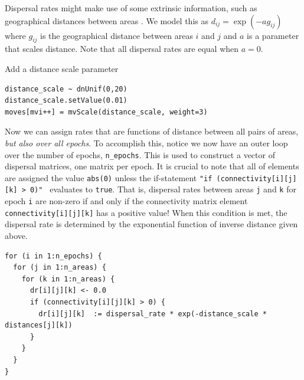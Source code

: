Dispersal rates might make use of some extrinsic information, such as geographical distances between areas \citep{MacArthur1967, Webb2012}.
We model this as $d_{ij} = \exp(-a g_{ij})$ where $g_{ij}$ is the geographical distance between areas $i$ and $j$ and $a$ is a parameter that scales distance.
Note that all dispersal rates are equal when $a=0$.

Add a distance scale parameter

\begin{snugshade}
\begin{lstlisting}
distance_scale ~ dnUnif(0,20)
distance_scale.setValue(0.01)
moves[mvi++] = mvScale(distance_scale, weight=3)
\end{lstlisting}
\end{snugshade}

Now we can assign rates that are functions of distance between all pairs of areas, {\it but also over all epochs}.
To accomplish this, notice we now have an outer loop over the number of epochs, {\tt n\_epochs}.
This is used to construct a vector of dispersal matrices, one matrix per epoch.
It is crucial to note that all of elements are assigned the value {\tt abs(0)} unless the if-statement {\tt "if (connectivity[i][j][k] > 0)" } evaluates to {\tt true}.
That is, dispersal rates between areas {\tt j} and {\tt k} for epoch {\tt i} are non-zero if and only if the connectivity matrix element {\tt connectivity[i][j][k]} has a positive value!
When this condition is met, the dispersal rate is determined by the exponential function of inverse distance given above.


\begin{snugshade}
\begin{lstlisting}
for (i in 1:n_epochs) {
  for (j in 1:n_areas) {
    for (k in 1:n_areas) {
      dr[i][j][k] <- 0.0
      if (connectivity[i][j][k] > 0) {
        dr[i][j][k]  := dispersal_rate * exp(-distance_scale * distances[j][k])
      }
    }
  }
}
\end{lstlisting}
\end{snugshade}




